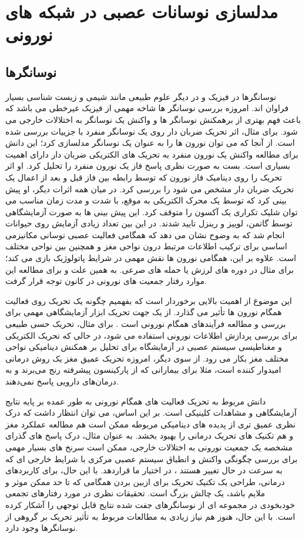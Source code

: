 
\section{   مدلسازی نوسانات عصبی در شبکه های نورونی }

\subsection{نوسانگرها}
نوسانگرها در فیزیک و در دیگر علوم طبیعی  مانند شیمی و زیست شناسی بسیار فراوان اند.
امروزه بررسی نوسانگر ها شاخه مهمی از فیزیک غیرخطی می باشد که باعث فهم بهتری از برهمکنش نوسانگر ها و واکنش  یک نوسانگر به اختلالات خارجی می شود.
برای مثال، اثر تحریک ضربان دار
روی یک نوسانگر منفرد با جزییات بررسی شده است. 
از آنجا که می توان نورون ها را به عنوان یک نوسانگر مدلسازی کرد؛ این دانش برای مطالعه واکنش یک نورون منفرد به تحریک های الکتریکی ضربان دار دارای اهمیت بسیاری است.
بست
به صورت نظری پاسخ فاز
یک نورون منفرد را تحلیل کرد.
\cite{best1979disrupting}
او اثر تحریک را روی دینامیک فاز نورون که توسط رابطه بین فاز قبل و بعد از اعمال یک تحریک ضربان دار مشخص می شود را بررسی کرد. در میان همه اثرات دیگر، او پیش بینی کرد که توسط یک محرک الکتریکی به موقع، با شدت و مدت زمان مناسب می توان شلیک تکراری یک آکسون را متوقف کرد. این پیش بینی ها به صورت آزمایشگاهی توسط گاتمن، لوییز و رینزل تایید شدند.
\cite{guttman1980control}
در این بین تعداد زیادی آزمایش روی حیوانات انجام شد که به وضوح نشان می دهد که همگامی فعالیت عصبی نوسانی مکانیزمی اساسی برای ترکیب اطلاعات مرتبط درون نواحی مغز و همچنین بین نواحی مختلف است. علاوه بر این، همگامی نورون ها نقش مهمی در شرایط پاتولوژیک بازی می کند؛ برای مثال در دوره های لرزش یا حمله های صرعی. به همین علت و برای مطالعه این موارد رفتار جمعیت های نورونی در کانون توجه قرار گرفت. 

این موضوع از اهمیت بالایی برخوردار است که بفهمیم چگونه یک تحریک روی فعالیت همگام نورون ها تأثیر می گذارد. از یک جهت تحریک ابزار آزمایشگاهی مهمی برای بررسی و مطالعه فرآیندهای همگام نورونی است . برای مثال، تحریک حسی طبیعی برای بررسی پردازش اطلاعات نورونی استفاده می شود، در حالی که تحریک الکتریکی و مغناطیسی سیستم عصبی در آزمایشگاه برای تحلیل بر همکنش دینامیکی نواحی مختلف مغز بکار می رود. از سوی دیگر، امروزه تحریک عمیق مغز یک روش درمانی امیدوار کننده است، مثلا برای بیمارانی که از پارکینسون پیشرفته رنج می‌برند و به درمان‌های دارویی پاسخ نمی‌دهند. 

دانش مربوط به تحریک فعالیت های همگام نورونی به طور عمده بر پایه نتایج آزمایشگاهی و مشاهدات کلینیکی است. بر این اساس، می توان انتظار داشت که درک نظری عمیق تری از پدیده های دینامیکی مربوطه ممکن است هم مطالعه عملکرد مغز و هم تکنیک های تحریک درمانی را بهبود بخشد. به عنوان مثال، درک پاسخ های گذرای مشخصه
یک جمعیت نورونی به اختلالات خارجی، ممکن است سرنخ های بسیار مهمی برای بررسی چگونگی واکنش و انطباق سیستم عصبی مرکزی با شرایط خارجی ای که به سرعت در حال تغییر هستند ، در اختیار ما قراردهد. با این حال، برای کاربردهای درمانی، طراحی یک تکنیک تحریک برای ازبین بردن همگامی که تا حد ممکن موثر و ملایم باشد، یک چالش بزرگ است. تحقیقات نظری در مورد رفتارهای تجمعی خودبخودی در مجموعه ای از نوسانگرهای جفت شده نتایج قابل توجهی را آشکار کرده است. با این حال، هنوز هم نیاز زیادی به مطالعات مربوط به تأثیر تحریک بر گروهی از نوسانگرها وجود دارد.

